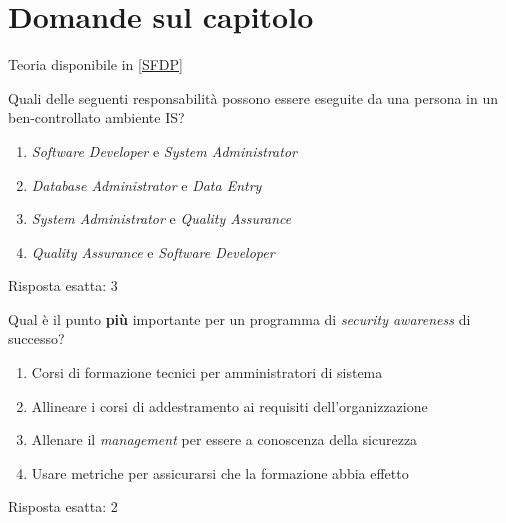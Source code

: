 \section{Domande sul capitolo}
\label{esSFDP:generali}

Teoria disponibile in \ref{SFDP}


\begin{Exercise} [
  title={Quiz},
  label={esSFDP5}
  ]

  \Question Quali delle seguenti responsabilità possono essere eseguite da una 
persona in un ben-controllato ambiente IS?
\begin{enumerate}
 \item \textit{Software Developer} e \textit{System Administrator}
 \item \textit{Database Administrator} e \textit{Data Entry}
 \item \textit{System Administrator} e \textit{Quality Assurance}
 \item \textit{Quality Assurance} e \textit{Software Developer}
\end{enumerate}
  
\end{Exercise}


\begin{Answer} [
  ref={esSFDP5},
  number={5}
  ]

  \Question Risposta esatta: 3
\end{Answer}


\begin{Exercise} [
  title={Quiz},
  label={esSFDP6}
  ]

  \Question Qual è il punto \textbf{più} importante per un programma di 
\textit{security awareness} di successo?
\begin{enumerate}
 \item Corsi di formazione tecnici per amministratori di sistema
 \item Allineare i corsi di addestramento ai requisiti dell'organizzazione
 \item Allenare il \textit{management} per essere a conoscenza della sicurezza
 \item Usare metriche per assicurarsi che la formazione abbia effetto
\end{enumerate}
  
\end{Exercise}


\begin{Answer} [
  ref={esSFDP6},
  number={6}
  ]

  \Question Risposta esatta: 2
\end{Answer}


